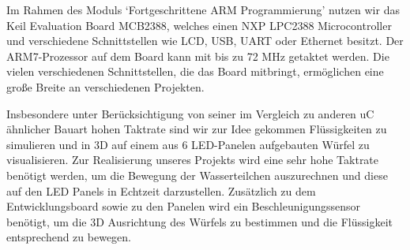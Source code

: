 Im Rahmen des Moduls `Fortgeschrittene ARM Programmierung' nutzen wir das Keil Evaluation Board MCB2388, welches einen NXP LPC2388 Microcontroller und verschiedene Schnittstellen wie LCD, USB, UART oder Ethernet besitzt. Der ARM7-Prozessor auf dem Board kann mit bis zu 72 MHz getaktet werden. Die vielen verschiedenen Schnittstellen, die das Board mitbringt, ermöglichen eine große Breite an verschiedenen Projekten.

Insbesondere unter Berücksichtigung von seiner im Vergleich zu anderen uC ähnlicher Bauart hohen Taktrate sind wir zur Idee gekommen Flüssigkeiten zu simulieren und in 3D auf einem aus 6 LED-Panelen aufgebauten Würfel zu visualisieren. Zur Realisierung unseres Projekts wird eine sehr hohe Taktrate benötigt werden, um die Bewegung der Wasserteilchen auszurechnen und diese auf den LED Panels in Echtzeit darzustellen. Zusätzlich zu dem Entwicklungsboard sowie zu den Panelen wird ein Beschleunigungssensor benötigt, um die 3D Ausrichtung des Würfels zu bestimmen und die Flüssigkeit entsprechend zu bewegen.

